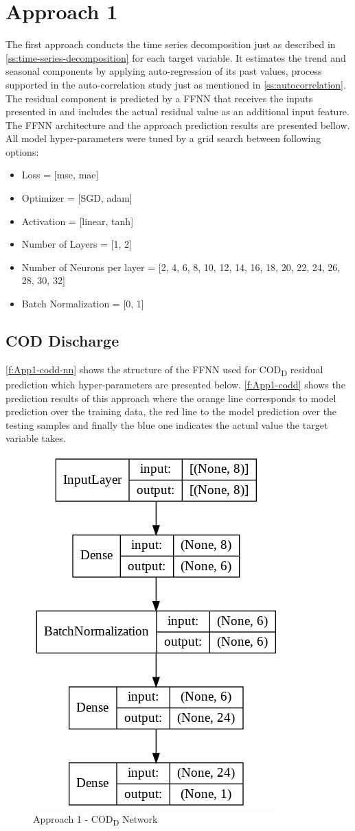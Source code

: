 \section{Approach 1}
\label{s:resutls-approach1}
The first approach conducts the time series decomposition just as described in \autoref{ss:time-series-decomposition} for each target variable. It estimates the trend and seasonal components by applying auto-regression of its past values, process supported in the auto-correlation study just as mentioned in \autoref{ss:autocorrelation}. The residual component is predicted by a \ac{FFNN} that receives the inputs presented in \label{s:results_data_selection} and includes the actual residual value as an additional input feature. The \ac{FFNN} architecture and the approach prediction results are presented bellow.
All model hyper-parameters were tuned by a grid search between following options:

\begin{itemize}
    \item Loss = [mse, mae]
    \item Optimizer = [SGD, adam]
    \item Activation = [linear, tanh]
    \item Number of Layers = [1, 2]
    \item Number of Neurons per layer = [2, 4, 6, 8, 10, 12, 14, 16, 18, 20, 22, 24, 26, 28, 30, 32]
    \item Batch Normalization = [0, 1]
\end{itemize}

\subsection{COD Discharge}
\autoref{f:App1-codd-nn} shows the structure of the \ac{FFNN} used for \ac{COD}\textsubscript{D} residual prediction which hyper-parameters are presented below. \autoref{f:App1-codd} shows the prediction results of this approach where the orange line corresponds to model prediction over the training data, the red line to the model prediction over the testing samples and finally the blue one indicates the actual value the target variable takes.

\begin{figure}[h]
\centering
 \includegraphics[width=0.4\linewidth]{figures/Ch5/App1_CODeq.png}
\caption{Approach 1 - COD\textsubscript{D} Network}
\label{f:App1-codd-nn}
\end{figure}

